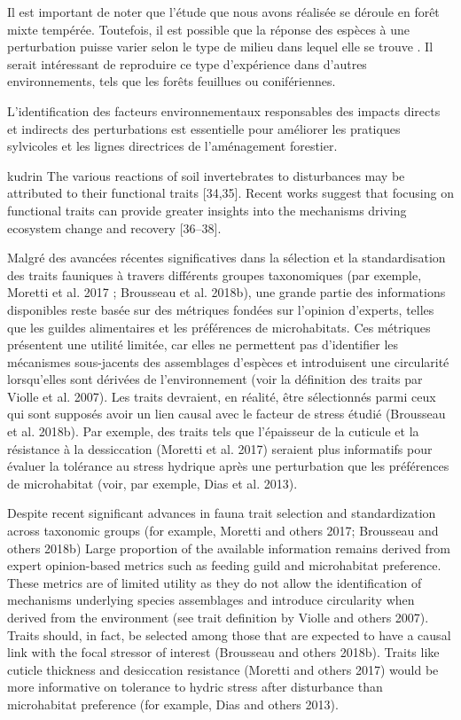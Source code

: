 Il est important de noter que l'étude que nous avons réalisée se déroule en forêt mixte tempérée.
Toutefois, il est possible que la réponse des espèces à une perturbation puisse varier selon le type de milieu dans lequel elle se trouve \citep{Kudrin2023metaanalysiseffects}. 
Il serait intéressant de reproduire ce type d'expérience dans d'autres environnements, tels que les forêts feuillues ou conifériennes.


L'identification des facteurs environnementaux responsables des impacts directs et indirects des perturbations est essentielle pour améliorer les pratiques sylvicoles et les lignes directrices de l'aménagement forestier.




kudrin The various reactions of soil invertebrates to disturbances may be attributed to their functional traits [34,35]. 
Recent works suggest that focusing on functional traits can provide greater insights into the mechanisms driving ecosystem change and recovery [36–38].

Malgré des avancées récentes significatives dans la sélection et la standardisation des traits fauniques à travers différents groupes taxonomiques 
(par exemple, Moretti et al. 2017 ; Brousseau et al. 2018b), une grande partie des informations disponibles reste basée sur des métriques fondées sur 
l'opinion d'experts, telles que les guildes alimentaires et les préférences de microhabitats. 
Ces métriques présentent une utilité limitée, car elles ne permettent pas d'identifier les mécanismes sous-jacents des assemblages d'espèces et 
introduisent une circularité lorsqu'elles sont dérivées de l'environnement (voir la définition des traits par Violle et al. 2007). 
Les traits devraient, en réalité, être sélectionnés parmi ceux qui sont supposés avoir un lien causal avec le facteur de stress étudié (Brousseau et al. 2018b). 
Par exemple, des traits tels que l'épaisseur de la cuticule et la résistance à la dessiccation (Moretti et al. 2017) seraient plus informatifs pour 
évaluer la tolérance au stress hydrique après une perturbation que les préférences de microhabitat (voir, par exemple, Dias et al. 2013).

Despite recent significant advances in fauna trait selection and standardization across taxonomic groups (for example, Moretti and others 2017; Brousseau and others 2018b)
Large proportion of the available information remains derived from expert opinion-based metrics such as feeding guild and microhabitat preference.
These metrics are of limited utility as they do not allow the identification of mechanisms underlying species assemblages and introduce circularity when derived from the environment (see trait definition by Violle and others 2007).
Traits should, in fact, be selected among those that are expected to have a causal link with the focal stressor of interest (Brousseau and others 2018b). Traits like cuticle thickness and desiccation resistance (Moretti and others 2017) would be more informative on tolerance to hydric stress after disturbance than microhabitat preference (for example, Dias and others 2013). 

